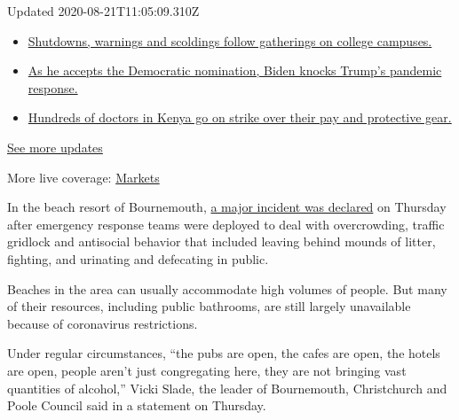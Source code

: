Updated 2020-08-21T11:05:09.310Z

\begin{itemize}
\tightlist
\item
  \href{https://www.nytimes3xbfgragh.onion/2020/08/21/world/covid-19-coronavirus.html?action=click\&pgtype=Article\&state=default\&region=MAIN_CONTENT_1\&context=storylines_live_updates\#link-4690b6aa}{Shutdowns,
  warnings and scoldings follow gatherings on college campuses.}
\item
  \href{https://www.nytimes3xbfgragh.onion/2020/08/21/world/covid-19-coronavirus.html?action=click\&pgtype=Article\&state=default\&region=MAIN_CONTENT_1\&context=storylines_live_updates\#link-324af071}{As
  he accepts the Democratic nomination, Biden knocks Trump's pandemic
  response.}
\item
  \href{https://www.nytimes3xbfgragh.onion/2020/08/21/world/covid-19-coronavirus.html?action=click\&pgtype=Article\&state=default\&region=MAIN_CONTENT_1\&context=storylines_live_updates\#link-35890b73}{Hundreds
  of doctors in Kenya go on strike over their pay and protective gear.}
\end{itemize}

\href{https://www.nytimes3xbfgragh.onion/2020/08/21/world/covid-19-coronavirus.html?action=click\&pgtype=Article\&state=default\&region=MAIN_CONTENT_1\&context=storylines_live_updates}{See
more updates}

More live coverage:
\href{https://www.nytimes3xbfgragh.onion/live/2020/08/20/business/stock-market-today-coronavirus?action=click\&pgtype=Article\&state=default\&region=MAIN_CONTENT_1\&context=storylines_live_updates}{Markets}

In the beach resort of Bournemouth,
\href{https://www.bournemouthecho.co.uk/news/18540767.police-security-staff-kept-busy-bournemouth-beach/}{a
major incident was declared} on Thursday after emergency response teams
were deployed to deal with overcrowding, traffic gridlock and antisocial
behavior that included leaving behind mounds of litter, fighting, and
urinating and defecating in public.

Beaches in the area can usually accommodate high volumes of people. But
many of their resources, including public bathrooms, are still largely
unavailable because of coronavirus restrictions.

Under regular circumstances, ``the pubs are open, the cafes are open,
the hotels are open, people aren't just congregating here, they are not
bringing vast quantities of alcohol,'' Vicki Slade, the leader of
Bournemouth, Christchurch and Poole Council said in a statement on
Thursday.

